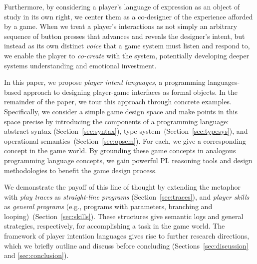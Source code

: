 \documentclass[sigconf]{acmart}
\begin{document}

%
%


Furthermore, by considering a player's language of expression as an object
of study in its own right, we center them as a co-designer of the experience
afforded by a game. When we treat a player's interactions as not simply an
arbitrary sequence of button presses that advances and reveals the
designer's intent, but instead as its own distinct {\em voice} that a game
system must listen and respond to, we enable the player to {\em co-create}
with the system, potentially developing deeper systems understanding
and emotional investment.

In this paper, we propose \emph{player intent languages}, a
programming languages-based approach to designing player-game
interfaces as formal objects.
%
In the remainder of the paper, we tour this approach through concrete
examples.
%
Specifically, we consider a simple game design space and make points
in this space precise by introducing the components of a programming
language:
%
abstract syntax (Section~\ref{sec:syntax}),
%
type system~(Section~\ref{sec:typesys}), 
%
and operational semantics~(Section~\ref{sec:opsem}).
%
For each, we give a corresponding concept in the game world.
%
By grounding these game concepts in analogous programming language
concepts, we gain powerful PL reasoning tools and design methodologies
to benefit the game design process.

We demonstrate the payoff of this line of thought by extending the
metaphor with \emph{play traces} as \emph{straight-line
  programs} (Section~\ref{sec:traces}), and {\em player skills} as
\emph{general programs} (e.g., programs with parameters, branching and
looping)~(Section~\ref{sec:skills}).
%
These structures give semantic logs and general strategies,
respectively, for accomplishing a task in the game world.
%
The framework of player intention languages gives rise to further research
directions, which we briefly outline and discuss before concluding
(Sections~\ref{sec:discussion} and \ref{sec:conclusion}).
\end{document}
